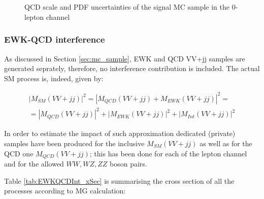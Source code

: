 \begin{figure}[ht]
        \centering
    	\\
    	\\
        \caption{QCD scale and PDF uncertainties of the signal MC sample in the 0-lepton channel}
    \label{fig:SigTheoUnc0Lep}
\end{figure}


\clearpage
\subsubsection{EWK-QCD interference}
\label{subsec:sig_uncer_interf}

As discussed in Section \ref{sec:mc_sample},
EWK and QCD VV+jj samples are generated seprately, therefore, no interference contribution is included.
The actual SM process is, indeed, given by:

\begin{equation}
    \begin{split}
        | M_{SM}(VV+jj) |^2 = | M_{QCD}(VV+jj) + M_{EWK}(VV+jj) |^2 =
                        \\ = |M_{QCD}(VV+jj)|^2 + |M_{EWK}(VV+jj)|^2 + |M_{Int}(VV+jj)|^2
    \end{split}
\end{equation}

In order to estimate the impact of such approximation dedicated (private) samples have been produced
for the inclusive $M_{SM}(VV+jj)$ as well as for the QCD one $M_{QCD}(VV+jj)$; 
this has been done for each of the lepton channel and for the allowed $WW, WZ, ZZ$ boson pairs.

Table \ref{tab:EWKQCDInt_xSec} is summarising the cross section of all the processes according to MG calculation:

